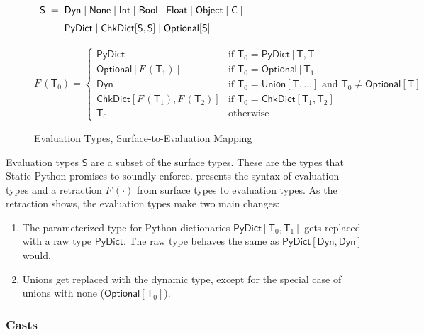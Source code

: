 \documentclass[english,cleveref,submission]{programming}
\makeatletter
\newcommand{\SP}{Static Python}
\newcommand{\defeq}{=}
\newcommand{\mfeq}{=}
\newcommand{\langmid}{\mid} %
\newenvironment{langarray}{\(\def\arraystretch{1.5}\begin{array}{l@{\hspace{2mm}}c@{\hspace{2mm}}l}}{\end{array}\)}
\newcommand{\typefont}[1]{\mathsf{#1}}
\newcommand{\paramtype}[2]{#1[#2]}
\newcommand{\sptype}{\typefont{T}}
\newcommand{\spteval}{\typefont{S}}
\newcommand{\sptclass}{\typefont{C}}
\newcommand{\sptint}{\typefont{Int}}
\newcommand{\sptbool}{\typefont{Bool}}
\newcommand{\sptfloat}{\typefont{Float}}
\newcommand{\sptdyn}{\typefont{Dyn}}
\newcommand{\sptobject}{\typefont{Object}}
\newcommand{\sptnone}{\typefont{None}}
\newcommand{\sptoptional}[1]{\paramtype{\typefont{Optional}}{#1}}
\newcommand{\sptunion}[1]{\paramtype{\typefont{Union}}{#1}}
\newcommand{\sptrawpydict}{\typefont{PyDict}}
\newcommand{\sptpydict}[2]{\paramtype{\sptrawpydict}{#1, #2}}
\newcommand{\sptchkdict}[2]{\paramtype{\typefont{ChkDict}}{#1, #2}}
\newcommand{\mfapply}[2]{#1\,(#2)}
\newcommand{\mffont}[1]{\mathit{#1}}
\newcommand{\mftypeF}[1]{\mfapply{\mffont{F}}{#1}} %
\makeatother
\begin{document}
\begin{figure}[t]
  \begin{langarray}
    \spteval & \defeq &
      \sptdyn \langmid
      \sptnone \langmid
      \sptint \langmid
      \sptbool \langmid
      \sptfloat \langmid
      \sptobject \langmid
      \sptclass \langmid
    \\ & &
      \sptrawpydict \langmid
      \sptchkdict{\spteval}{\spteval} \langmid
      \sptoptional{\spteval}
  \end{langarray}

  \bigskip
  \(
    \mftypeF{\sptype_0}
    \mfeq
    \left\{\begin{array}{ll}
      \sptrawpydict & \mbox{if $\sptype_0 = \sptpydict{\sptype}{\sptype}$}
    \\
      \sptoptional{\mftypeF{\sptype_1}} & \mbox{if $\sptype_0 = \sptoptional{\sptype_1}$}
    \\
      \sptdyn & \mbox{if $\sptype_0 = \sptunion{\sptype, \ldots}$ and $\sptype_0 \neq \sptoptional{\sptype}$}
    \\
      \sptchkdict{\mftypeF{\sptype_1}}{\mftypeF{\sptype_2}} & \mbox{if $\sptype_0 = \sptchkdict{\sptype_1}{\sptype_2}$}
    \\
      \sptype_0 & \mbox{otherwise}
    \end{array}\right.
  \)

  \caption{Evaluation Types, Surface-to-Evaluation Mapping}
  \label{f:surface-to-eval-types}
\end{figure}

Evaluation types $\spteval$ are a subset of the surface types.
These are the types that \SP{} promises to soundly enforce.
 presents the syntax of evaluation types
and a retraction $\mftypeF{\cdot}$ from surface types to evaluation types.
As the retraction shows, the evaluation types make two main changes:
\begin{enumerate}
  \item
    The parameterized type for Python dictionaries
    $\sptpydict{\sptype_0}{\sptype_1}$ gets replaced with
    a raw type $\sptrawpydict$.
    The raw type behaves the same as $\sptpydict{\sptdyn}{\sptdyn}$ would.
  \item
    Unions get replaced with the dynamic type, except for the special case
    of unions with none ($\sptoptional{\sptype_0}$).
\end{enumerate}


\subsubsection{Casts}
\end{document}
